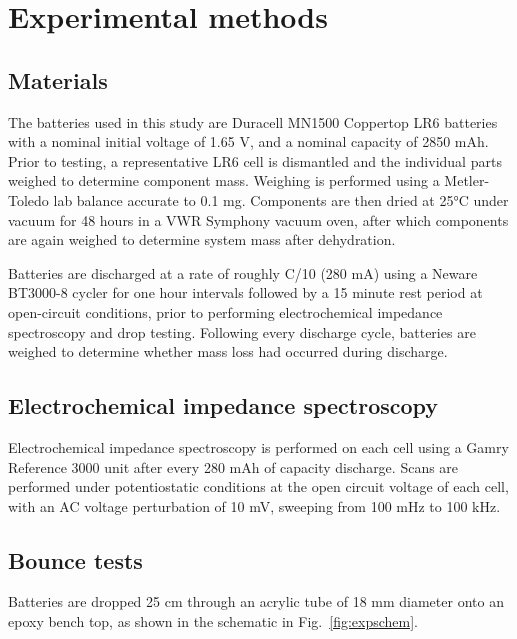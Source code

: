 \section{Experimental methods}
\label{sec:dbb:exp}

\subsection{Materials}

The batteries used in this study are Duracell MN1500 Coppertop LR6 batteries with a nominal initial voltage of 1.65 V, and a nominal capacity of 2850 mAh. Prior to testing, a representative LR6 cell is dismantled and the individual parts weighed to determine component mass. Weighing is performed using a Metler-Toledo lab balance accurate to 0.1 mg. Components are then dried at 25°C under vacuum for 48 hours in a VWR Symphony vacuum oven, after which components are again weighed to determine system mass after dehydration.

Batteries are discharged at a rate of roughly C/10 (280 mA) using a Neware BT3000-8 cycler for one hour intervals followed by a 15 minute rest period at open-circuit conditions, prior to performing electrochemical impedance spectroscopy and drop testing. Following every discharge cycle, batteries are weighed to determine whether mass loss had occurred during discharge.


\subsection{Electrochemical impedance spectroscopy}

Electrochemical impedance spectroscopy is performed on each cell using a Gamry Reference 3000 unit after every 280 mAh of capacity discharge. Scans are performed under potentiostatic conditions at the open circuit voltage of each cell, with an AC voltage perturbation of 10 mV, sweeping from 100 mHz to 100 kHz. 



\subsection{Bounce tests}

Batteries are dropped 25 cm through an acrylic tube of 18 mm diameter onto an epoxy bench top, as shown in the schematic in Fig.~\ref{fig:expschem}. 

